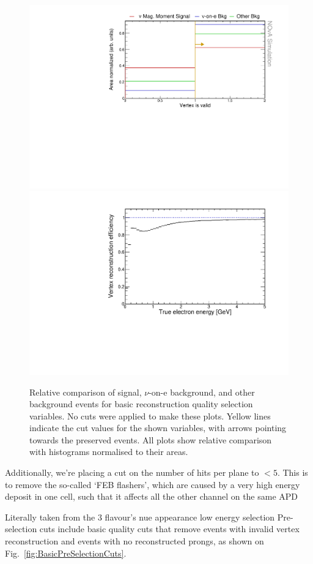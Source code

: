 \begin{figure}[hbtp]
\centering
\includegraphics[width=.75\textwidth]{Plots/NuMMEventSelection/N1Cut_vtxIsValid.pdf}
\includegraphics[width=.75\textwidth]{Plots/NuMMEventSelection/VtxIsValidNuMM.pdf}
\caption{Relative comparison of signal, $\nu$-on-e background, and other background events for basic reconstruction quality selection variables. No cuts were applied to make these plots. Yellow lines indicate the cut values for the shown variables, with arrows pointing towards the preserved events. All plots show relative comparison with histograms normalised to their areas.}
\label{fig:NuMMCutsVertexIsValid}
\end{figure}

Additionally, we're placing a cut on the number of hits per plane to $<5$. This is to remove the so-called `\gls{FEB} flashers', which are caused by a very high energy deposit in one cell, such that it affects all the other channel on the same \gls{APD} \cite{NOvA-doc-37668}

Literally taken from the 3 flavour's nue appearance low energy selection
Pre-selection cuts include basic quality cuts that remove events with invalid vertex reconstruction and events with no reconstructed prongs, as shown on Fig.~\ref{fig:BasicPreSelectionCuts}.

